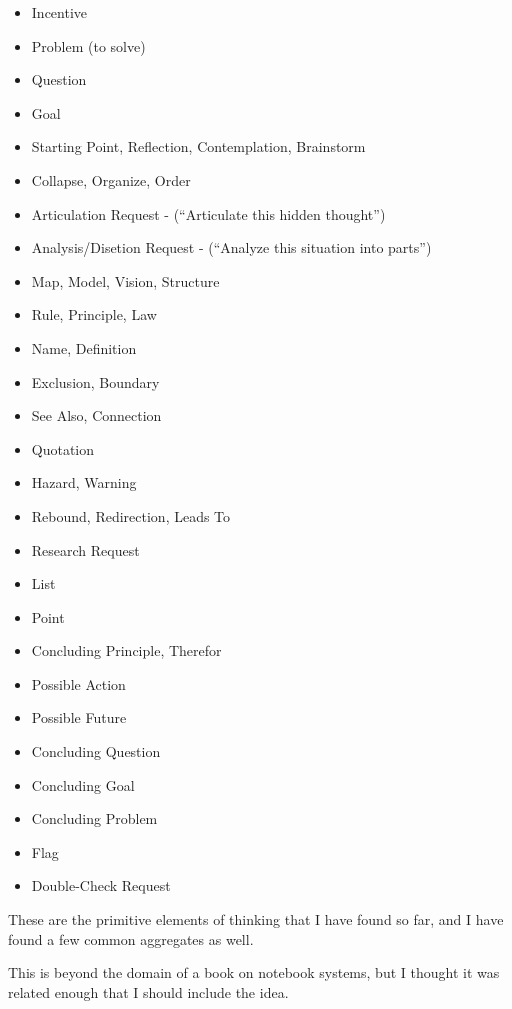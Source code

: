 \documentclass[oneside]{book}
\begin{document}
\begin{itemize}
\item Incentive
\item Problem (to solve)
\item Question
\item Goal

\item Starting Point, Reflection, Contemplation, Brainstorm
\item Collapse, Organize, Order

\item Articulation Request - (``Articulate this hidden thought'')
\item Analysis/Disetion Request - (``Analyze this situation into parts'')

\item Map, Model, Vision, Structure
\item Rule, Principle, Law
\item Name, Definition
\item Exclusion, Boundary

\item See Also, Connection
\item Quotation

\item Hazard, Warning
\item Rebound, Redirection, Leads To

\item Research Request

\item List
\item Point

\item Concluding Principle, Therefor
\item Possible Action
\item Possible Future
\item Concluding Question
\item Concluding Goal
\item Concluding Problem

\item Flag
\item Double-Check Request
\end{itemize}

These are the primitive elements of thinking that I have found so far,
and I have found a few common aggregates as well.

This is beyond the domain of a book on notebook systems, but I thought
it was related enough that I should include the idea.
\end{document}
